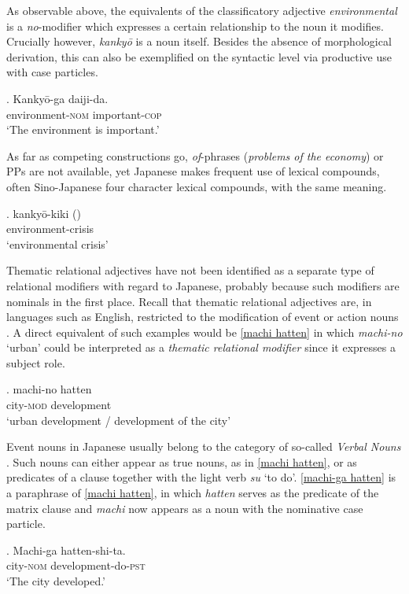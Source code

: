 As observable above, the equivalents of the classificatory adjective \textit{environmental} is a \textit{no}-modifier which expresses a certain relationship to the noun it modifies. Crucially however, \textit{kankyō} is a noun itself. Besides the absence of morphological derivation, this can also be exemplified on the syntactic level via productive use with case particles.

\exg. Kankyō-ga daiji-da.\\
environment-\textsc{nom} important-\textsc{cop}\\
`The environment is important.’

As far as competing constructions go, \textit{of}-phrases (\textit{problems of the economy}) or PPs are not available, yet Japanese makes frequent use of lexical compounds, often Sino-Japanese four character lexical compounds, with the same meaning.

\exg. kankyō-kiki ()\\
environment-crisis\\
`environmental crisis’

Thematic relational adjectives have not been identified as a separate type of relational modifiers with regard to Japanese, probably because such modifiers are nominals in the first place. Recall that thematic relational adjectives are, in languages such as English, restricted to the modification of event or action nouns \citep{grimshaw:1991:argument}. A direct equivalent of such examples would be \ref{machi hatten} in which \textit{machi-no} `urban’ could be interpreted as a \textit{thematic relational modifier} since it expresses a subject role.

\exg. machi-no hatten\\
city-\textsc{mod} development\\
`urban development / development of the city’ \label{machi hatten}

Event nouns in Japanese usually belong to the category of so-called \textit{Verbal Nouns} \citep{teramura:1982:nihongo, oshima:2019:gradability}. Such nouns can either appear as true nouns, as in \ref{machi hatten}, or as predicates of a clause together with the light verb \textit{su} `to do’. \ref{machi-ga hatten} is a paraphrase of \ref{machi hatten}, in which \textit{hatten} serves as the predicate of the matrix clause and \textit{machi} now appears as a noun with the nominative case particle.

\exg. Machi-ga hatten-shi-ta.\\
city-\textsc{nom} development-do-\textsc{pst}\\
`The city developed.’ \label{machi-ga hatten}


